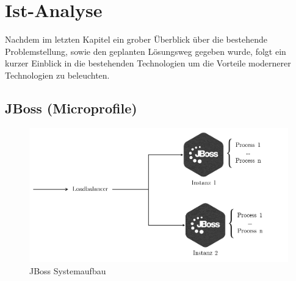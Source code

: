\chapter{Ist-Analyse}

Nachdem im letzten Kapitel ein grober Überblick über die bestehende Problemstellung, sowie den geplanten Lösungsweg gegeben wurde, folgt ein kurzer Einblick in die bestehenden Technologien um die Vorteile modernerer Technologien zu beleuchten. 

\section{JBoss (Microprofile) \checkmark}



\begin{figure}[b!]
	\centering
	\includegraphics[width=.7\linewidth]{kapitel/ist-analyse/_img/jbossOverview}
	\caption[JBoss Systemaufbau]{JBoss Systemaufbau}
	\label{fig:jbossArch}
\end{figure}



